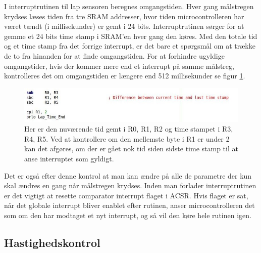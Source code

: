 I interruptrutinen til lap sensoren beregnes omgangstiden. Hver gang målstregen krydses læses tiden fra tre SRAM addresser, hvor tiden microcontrolleren har været tændt (i millisekunder) er gemt i 24 bits. Interruptrutinen sørger for at gemme et 24 bits time stamp i SRAM'en hver gang den køres. Med den totale tid og et time stamp fra det forrige interrupt, er det bare et spørgsmål om at trække de to fra hinanden for at finde omgangstiden. For at forhindre ugyldige omgangstider, hvis der kommer mere end et interrupt på samme målstreg, kontrolleres det om omgangstiden er længere end 512 millisekunder se figur \ref{fig:LapTime}.

\begin{figure}[h]

	\centering
		\includegraphics[scale=0.5]{Billeder/LapTime.jpg}
	\caption{Her er den nuværende tid gemt i R0, R1, R2 og time stampet i R3, R4, R5. Ved at kontrollere om den mellemste byte i R1 er under 2 kan det afgøres, om der er gået nok tid siden sidste time stamp til at anse interruptet som gyldigt.}
	\label{fig:LapTime}
	
\end{figure}

Det er også efter denne kontrol at man kan ændre på alle de parametre der kun skal ændres en gang når målstregen krydses. Inden man forlader interruptrutinen er det vigtigt at resette comparator interrupt flaget i ACSR. Hvis flaget er sat, når det globale interrupt bliver enablet efter rutinen, anser microcontrolleren det som om den har modtaget et nyt interrupt, og så vil den køre hele rutinen igen.

\subsection{Hastighedskontrol}

